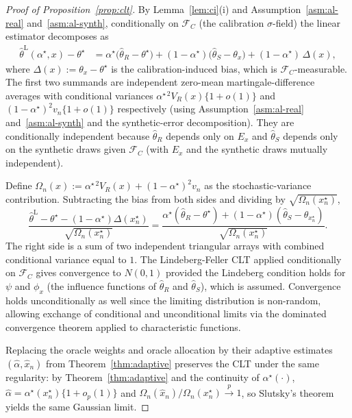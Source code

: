 \begin{proof}[Proof of Proposition~\ref{prop:clt}]
By Lemma~\ref{lem:ci}(i) and Assumption~\ref{asm:al-real} and~\ref{asm:al-synth}, conditionally on $\mathcal{F}_C$ (the calibration $\sigma$-field) the linear estimator decomposes as
\begin{align*}
\hat\theta^{\mathrm{L}}(\alpha^\star, x) - \theta^\star
&= \alpha^\star \bigl(\hat\theta_R - \theta^\star\bigr)
   + (1-\alpha^\star) \bigl(\hat\theta_S - \theta_x\bigr)
   + (1-\alpha^\star)\, \Delta(x),
\end{align*}
where $\Delta(x) := \theta_x - \theta^\star$ is the calibration-induced bias, which is $\mathcal{F}_C$-measurable. The first two summands are independent zero-mean martingale-difference averages with conditional variances $\alpha^{\star\, 2} V_R(x)\{1+o(1)\}$ and $(1-\alpha^\star)^2 v_n\{1+o(1)\}$ respectively (using Assumption~\ref{asm:al-real} and~\ref{asm:al-synth} and the synthetic-error decomposition). They are conditionally independent because $\hat\theta_R$ depends only on $E_x$ and $\hat\theta_S$ depends only on the synthetic draws given $\mathcal{F}_C$ (with $E_x$ and the synthetic draws mutually independent).

Define $\Omega_n(x) := \alpha^{\star\, 2} V_R(x) + (1-\alpha^\star)^2 v_n$ as the stochastic-variance contribution. Subtracting the bias from both sides and dividing by $\sqrt{\Omega_n(x_n^\star)}$,
\[
\frac{\hat\theta^{\mathrm{L}} - \theta^\star - (1-\alpha^\star)\Delta(x_n^\star)}
{\sqrt{\Omega_n(x_n^\star)}}
= \frac{\alpha^\star (\hat\theta_R - \theta^\star) + (1-\alpha^\star)(\hat\theta_S - \theta_{x_n^\star})}
{\sqrt{\Omega_n(x_n^\star)}}.
\]
The right side is a sum of two independent triangular arrays with combined conditional variance equal to $1$. The Lindeberg-Feller CLT applied conditionally on $\mathcal{F}_C$ gives convergence to $N(0,1)$ provided the Lindeberg condition holds for $\psi$ and $\phi_x$ (the influence functions of $\hat\theta_R$ and $\hat\theta_S$), which is assumed. Convergence holds unconditionally as well since the limiting distribution is non-random, allowing exchange of conditional and unconditional limits via the dominated convergence theorem applied to characteristic functions.

Replacing the oracle weights and oracle allocation by their adaptive estimates $(\hat\alpha, \hat x_n)$ from Theorem~\ref{thm:adaptive} preserves the CLT under the same regularity: by Theorem~\ref{thm:adaptive} and the continuity of $\alpha^\star(\cdot)$, $\hat\alpha = \alpha^\star(x_n^\star)\{1+o_p(1)\}$ and $\Omega_n(\hat x_n)/\Omega_n(x_n^\star) \stackrel{p}{\to} 1$, so Slutsky's theorem yields the same Gaussian limit.
\end{proof}

